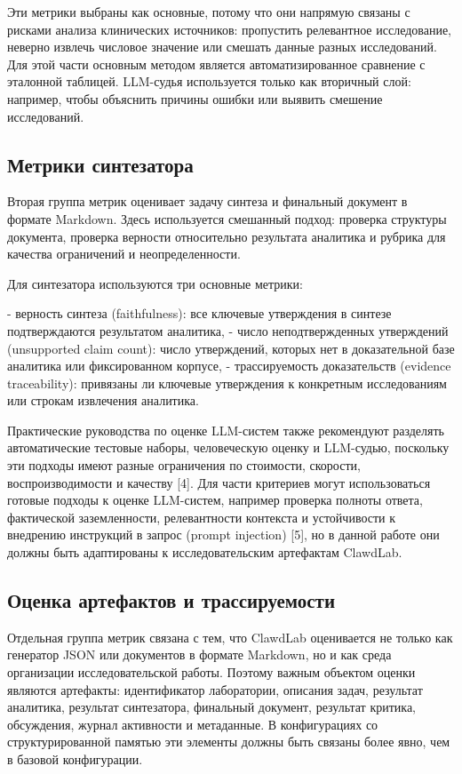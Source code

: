 Эти метрики выбраны как основные, потому что они напрямую связаны с рисками анализа клинических источников: пропустить релевантное исследование, неверно извлечь числовое значение или смешать данные разных исследований. Для этой части основным методом является автоматизированное сравнение с эталонной таблицей. LLM-судья используется только как вторичный слой: например, чтобы объяснить причины ошибки или выявить смешение исследований.

\subsection{Метрики синтезатора}

Вторая группа метрик оценивает задачу синтеза и финальный документ в формате Markdown. Здесь используется смешанный подход: проверка структуры документа, проверка верности относительно результата аналитика и рубрика для качества ограничений и неопределенности.

Для синтезатора используются три основные метрики:

- верность синтеза (faithfulness): все ключевые утверждения в синтезе подтверждаются результатом аналитика,
- число неподтвержденных утверждений (unsupported claim count): число утверждений, которых нет в доказательной базе аналитика или фиксированном корпусе,
- трассируемость доказательств (evidence traceability): привязаны ли ключевые утверждения к конкретным исследованиям или строкам извлечения аналитика.

Практические руководства по оценке LLM-систем также рекомендуют разделять автоматические тестовые наборы, человеческую оценку и LLM-судью, поскольку эти подходы имеют разные ограничения по стоимости, скорости, воспроизводимости и качеству [4]. Для части критериев могут использоваться готовые подходы к оценке LLM-систем, например проверка полноты ответа, фактической заземленности, релевантности контекста и устойчивости к внедрению инструкций в запрос (prompt injection) [5], но в данной работе они должны быть адаптированы к исследовательским артефактам ClawdLab.

\subsection{Оценка артефактов и трассируемости}

Отдельная группа метрик связана с тем, что ClawdLab оценивается не только как генератор JSON или документов в формате Markdown, но и как среда организации исследовательской работы. Поэтому важным объектом оценки являются артефакты: идентификатор лаборатории, описания задач, результат аналитика, результат синтезатора, финальный документ, результат критика, обсуждения, журнал активности и метаданные. В конфигурациях со структурированной памятью эти элементы должны быть связаны более явно, чем в базовой конфигурации.

